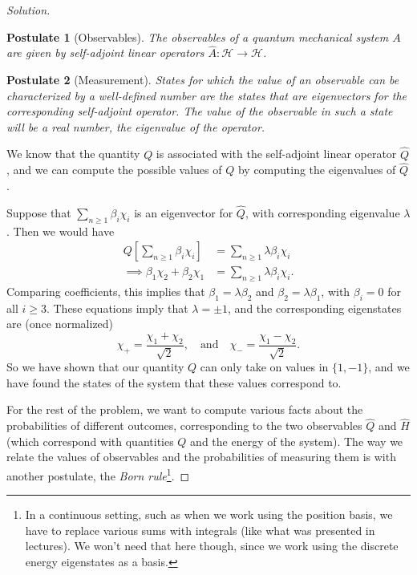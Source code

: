 \documentclass[a4paper]{scrartcl}
\newtheorem*{postulate}{Postulate}
\begin{document}
\begin{proof}[Solution]
    \begin{postulate}[Observables]
        The observables of a quantum mechanical system $A$ are given by self-adjoint linear operators $\hat{A} : \mathcal{H} \rightarrow \mathcal{H}$.        
    \end{postulate}

    \begin{postulate}[Measurement]
        States for which the value of an observable can be characterized by a well-defined number are the states that are eigenvectors for the corresponding self-adjoint operator. The value of the observable in such a state will be a real number, the eigenvalue of the operator.
    \end{postulate}

    We know that the quantity $Q$ is associated with the self-adjoint linear operator $\hat{Q}$, and we can compute the possible values of $Q$ by computing the eigenvalues of $\hat{Q}$.

    Suppose that $\sum_{n \geq 1} \beta_i \chi_i$ is an eigenvector for $\hat{Q}$, with corresponding eigenvalue $\lambda$.
    Then we would have
    \begin{align*}
       Q\left[\sum_{n \geq 1} \beta_i \chi_i\right] &= \sum_{n \geq 1} \lambda \beta_i \chi_i \\ 
\implies \beta_1 \chi_2 + \beta_2 \chi_1 &= \sum_{n \geq 1} \lambda \beta_i \chi_i.
    \end{align*}
    Comparing coefficients, this implies that 
    $\beta_1 = \lambda \beta_2$ and $\beta_2 = \lambda \beta_1$, with $\beta_i = 0$ for all $i \geq 3$. These equations imply that $\lambda = \pm 1$, and the corresponding eigenstates are
    (once normalized)
    $$
    \chi_+ = \frac{\chi_1 + \chi_2}{\sqrt{2}}, \quad \text{and} \quad \chi_- = \frac{\chi_1 - \chi_2}{\sqrt{2}}.
    $$
    So we have shown that our quantity $Q$ can only take on values in $\{1, -1\}$, and we have found the states of the system that these values correspond to.

    For the rest of the problem, we want to compute various facts about the probabilities of different outcomes, corresponding to the two observables $\hat{Q}$ and $\hat{H}$ (which correspond with quantities $Q$ and the energy of the system). The way we relate the values of observables and the probabilities of measuring them is with another postulate, the \emph{Born rule}\footnote{In a continuous setting, such as when we work using the position basis, we have to replace various sums with integrals (like what was presented in lectures). We won't need that here though, since we work using the discrete energy eigenstates as a basis.}.


\end{proof}
\end{document}
